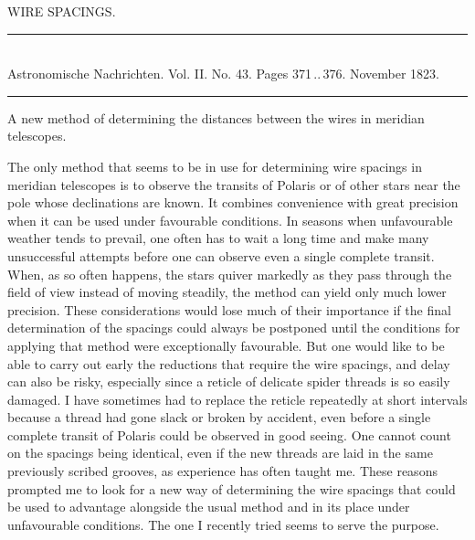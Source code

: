 \clearpage
{}
\hypertarget{native-450-fadenintervalle}{}
\begin{center}
{\large WIRE SPACINGS.}
\end{center}

\begin{center}
\rule{0.5\linewidth}{0.4pt}\\[2pt]
Astronomische Nachrichten. Vol. II. No. 43. Pages 371\,..\,376. November 1823.\\[2pt]
\rule{0.5\linewidth}{0.4pt}
\end{center}

\begin{center}
A new method of determining the distances between the wires in meridian telescopes.
\end{center}

The only method that seems to be in use for determining wire spacings in meridian telescopes is to observe the transits of Polaris or of other stars near the pole
%
whose declinations are known. It combines convenience with great precision when it can be used under favourable conditions. In seasons when unfavourable weather tends to prevail, one often has to wait a long time and make many unsuccessful attempts before one can observe even a single complete transit. When, as so often happens, the stars quiver markedly as they pass through the field of view instead of moving steadily, the method can yield only much lower precision. These considerations would lose much of their importance if the final determination of the spacings could always be postponed until the conditions for applying that method were exceptionally favourable. But one would like to be able to carry out early the reductions that require the wire spacings, and delay can also be risky, especially since a reticle of delicate spider threads is so easily damaged. I have sometimes had to replace the reticle repeatedly at short intervals because a thread had gone slack or broken by accident, even before a single complete transit of Polaris could be observed in good seeing. One cannot count on the spacings being identical, even if the new threads are laid in the same previously scribed grooves, as experience has often taught me. These reasons prompted me to look for a new way of determining the wire spacings that could be used to advantage alongside the usual method and in its place under unfavourable conditions. The one I recently tried seems to serve the purpose.

